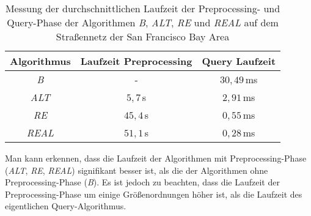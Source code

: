 \begin{table}[h] %
	\centering %
	\def\arraystretch{1.5}
	\begin{tabular}{|c| c| c|}
		\hline %
		\: \: \textbf{Algorithmus} \: \: & \: \: \textbf{Laufzeit Preprocessing} \: \: & \: \: \textbf{Query Laufzeit} \: \: \\
		\hline %
		\textit{B} & - & $30,49$\,ms  \\
		\textit{ALT} & $5,7$\,s & $2,91$\,ms  \\
		\textit{RE} & $45,4$\,s & $0,55$\,ms  \\
		\textit{REAL} & $51,1$\,s & $0,28$\,ms  \\
		\hline %
	\end{tabular}
	\caption{Messung der durchschnittlichen Laufzeit der Preprocessing- und Query-Phase der Algorithmen \textit{B}, \textit{ALT}, \textit{RE} und \textit{REAL} auf dem Straßennetz der San Francisco Bay Area} %
	\label{tab:Experimentelle Analyse} %
\end{table} %

Man kann erkennen, dass die Laufzeit der Algorithmen mit Preprocessing-Phase (\textit{ALT}, \textit{RE}, \textit{REAL}) signifikant besser ist, als die der Algorithmen ohne Preprocessing-Phase (\textit{B}). Es ist jedoch zu beachten, dass die Laufzeit der Preprocessing-Phase um einige Größenordnungen höher ist, als die Laufzeit des eigentlichen Query-Algorithmus.



